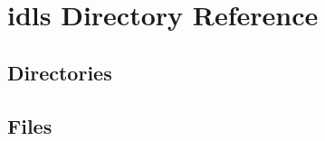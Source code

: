 \section{idls Directory Reference}
\label{dir_8741245f4539f7eff856bdc04d155249}
\subsection*{Directories}
\begin{DoxyCompactItemize}
\end{DoxyCompactItemize}
\subsection*{Files}
\begin{DoxyCompactItemize}
\end{DoxyCompactItemize}
